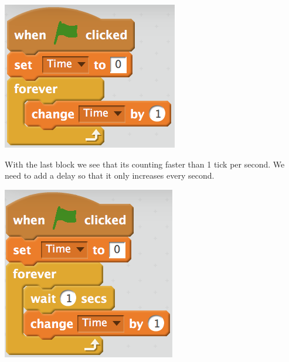 \documentclass[12pt]{article}
\begin{document}
\begin{itemize}
\begin{center}
			\item[] \includegraphics[scale=.50]{./Images/dragon14.png}
		\end{center}
		\item With the last block we see that its counting faster than 1 tick per second. We need to add a delay so that it only increases every second.
		\begin{center}
			\item[] \includegraphics[scale=.50]{./Images/dragon15}
		\end{center}
	\end{itemize}
\end{document}
